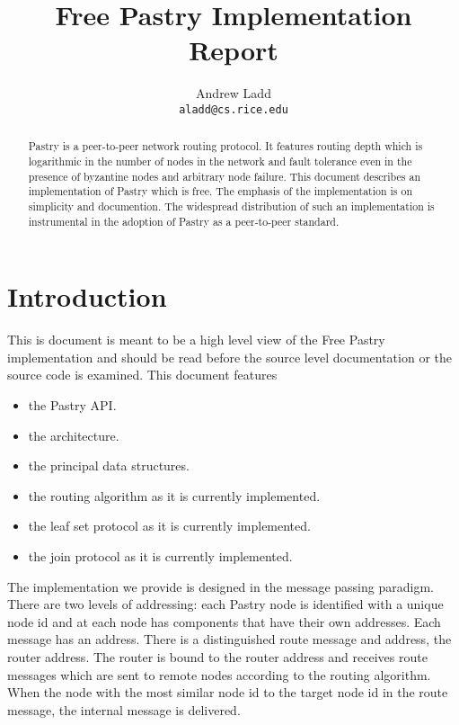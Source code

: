 \documentclass{article}
\title{Free Pastry Implementation Report}
\author{Andrew Ladd\\ {\tt aladd@cs.rice.edu}}
\begin{document}
\maketitle

\begin{abstract}
Pastry is a peer-to-peer network routing protocol.  It features
routing depth which is logarithmic in the number of nodes in the
network and fault tolerance even in the presence of byzantine nodes and
arbitrary node failure.  This document describes an implementation of
Pastry which is free.  The emphasis of the implementation is on
simplicity and documention.  The widespread distribution of such an
implementation is instrumental in the adoption of Pastry as a
peer-to-peer standard.
\end{abstract}

\section{Introduction}

This is document is meant to be a high level view of the Free Pastry
implementation and should be read before the source level
documentation or the source code is examined.  This document features

\begin{itemize}
\item the Pastry API.
\item the architecture.
\item the principal data structures.
\item the routing algorithm as it is currently
  implemented.
\item the leaf set protocol as it is currently
  implemented.
\item the join protocol as it is currently
  implemented.
\end{itemize}

The implementation we provide is designed in the message passing
paradigm.  There are two levels of addressing: each Pastry node is
identified with a unique node id and at each node has components that
have their own addresses.  Each message has an address.  There is a
distinguished route message and address, the router address.  The
router is bound to the router address and receives route messages
which are sent to remote nodes according to the routing algorithm. When
the node with the most similar node id to the target node id in the
route message, the internal message is delivered.
\end{document}
